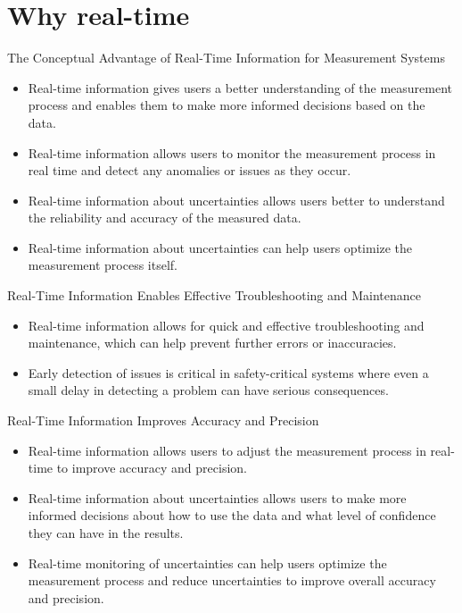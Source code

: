 \section{Why real-time}

\begin{frame}{The Conceptual Advantage of Real-Time Information for Measurement Systems}

\begin{itemize}
\item Real-time information gives users a better understanding of the measurement process and enables them to make more informed decisions based on the data.
\item Real-time information allows users to monitor the measurement process in real time and detect any anomalies or issues as they occur.
\item Real-time information about uncertainties allows users better to understand the reliability and accuracy of the measured data.
\item Real-time information about uncertainties can help users optimize the measurement process itself.
\end{itemize}

\end{frame}

\begin{frame}{Real-Time Information Enables Effective Troubleshooting and Maintenance}

\begin{itemize}
\item Real-time information allows for quick and effective troubleshooting and maintenance, which can help prevent further errors or inaccuracies.
\item Early detection of issues is critical in safety-critical systems where even a small delay in detecting a problem can have serious consequences.
\end{itemize}

\end{frame}

\begin{frame}{Real-Time Information Improves Accuracy and Precision}

\begin{itemize}
\item Real-time information allows users to adjust the measurement process in real-time to improve accuracy and precision.
\item Real-time information about uncertainties allows users to make more informed decisions about how to use the data and what level of confidence they can have in the results.
\item Real-time monitoring of uncertainties can help users optimize the measurement process and reduce uncertainties to improve overall accuracy and precision.
\end{itemize}

\end{frame}

